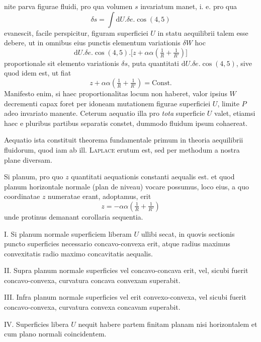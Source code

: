 nite parva figurae fluidi, pro qua volumen $s$ invariatum manet, i. e. pro qua
\[
\delta s=\int\mathrm{d}U.\delta e.\cos(4,5)
\]
evanescit, facile perspicitur, figuram superficiei $U$ in statu aequilibrii talem esse debere, ut in omnibus eius punctis elementum variationis $\delta W$ hoc
\[
\mathrm{d}U.\delta e.\cos(4,5).\bigl[z+\alpha\alpha(\tfrac1R+\tfrac1{R'})\bigr]
\]
proportionale sit elemento variationis $\delta s$, puta quantitati $\mathrm{d}U.\delta e.\cos(4,5)$, sive quod idem est, ut fiat
\[
z+\alpha\alpha(\tfrac1R+\tfrac1{R'})=\mathrm{Const.}
\]
Manifesto enim, si haec proportionalitas locum non haberet, valor ipsius $W$ decrementi capax foret per idoneam mutationem figurae superficiei $U$, limite $P$ adeo invariato manente. Ceterum aequatio illa pro \textit{tota} superficie $U$ valet, etiamsi haec e pluribus partibus separatis constet, dummodo fluidum ipsum cohaereat.

Aequatio ista constituit theorema fundamentale primum in theoria aequilibrii fluidorum, quod iam ab ill. \textsc{Laplace} erutum est, sed per methodum a nostra plane diversam.

Si planum, pro quo $z$ quantitati aequationis constanti aequalis est. et quod planum horizontale normale (plan de niveau) vocare possumus, loco eius, a quo coordinatae $z$ numeratae erant, adoptamus, erit
\[
z=-\alpha\alpha(\tfrac1R+\tfrac1{R'})
\]
unde protinus demanant corollaria sequentia.

I. Si planum normale superficiem liberam $U$ ullibi secat, in quovis sectionis puncto superficies necessario concavo-convexa erit, atque radius maximus convexitatis radio maximo concavitatis aequalis.

II. Supra planum normale superficies vel concavo-concava erit, vel, sicubi fuerit concavo-convexa, curvatura concava convexam superabit.

III. Infra planum normale superficies vel erit convexo-convexa, vel sicubi fuerit concavo-convexa, curvatura convexa concavam superabit.

IV. Superficies libera $U$ nequit habere partem finitam planam nisi horizontalem et cum plano normali coincidentem.

